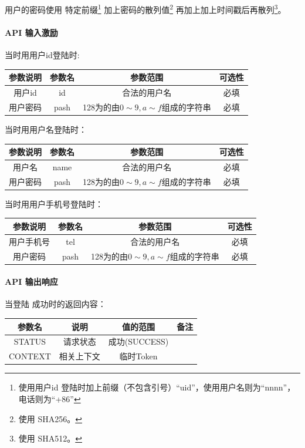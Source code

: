 \documentclass[UTF8]{article}
\def\apiexc{\paragraph{\colorbox[rgb]{1,0.85,0.45}{API 输入激励}}} %
\def\apiresp{\paragraph{\colorbox[rgb]{0.9,0.9,1}{API 输出响应}}} %
\def\成功{\colorbox[rgb]{0.4,1,0.5}{成功}}
\def\成功V{成功(SUCCESS)}
\begin{document}
    用户的密码使用 特定前缀\footnote{使用用户id 登陆时加上前缀（不包含引号）“uid”，使用用户名则为“nnnn”，电话则为“+86”}
    加上密码的散列值\footnote{使用 SHA256。}
    再加上加上时间戳后再散列\footnote{使用 SHA512。}。
    \apiexc
    当时用用户id登陆时:\\
    \begin{tabular}{|c|c|c|c|}
        \hline \rule[-2ex]{0pt}{5.5ex} 参数说明 & 参数名 & 参数范围 & 可选性 \\
        \hline \rule[-2ex]{0pt}{5.5ex} 用户id & id & 合法的用户名 & 必填 \\
        \hline \rule[-2ex]{0pt}{5.5ex} 用户密码 & pash & 128为的由$0\sim9,a\sim f$组成的字符串 & 必填 \\
        \hline 
    \end{tabular} 
    \par 当时用用户名登陆时：\\
    \begin{tabular}{|c|c|c|c|}
        \hline \rule[-2ex]{0pt}{5.5ex} 参数说明 & 参数名 & 参数范围 & 可选性 \\
        \hline \rule[-2ex]{0pt}{5.5ex} 用户名 & name & 合法的用户名 & 必填 \\
        \hline \rule[-2ex]{0pt}{5.5ex} 用户密码 & pash & 128为的由$0\sim9,a\sim f$组成的字符串 & 必填 \\
        \hline 
    \end{tabular} 
    \par 当时用用户手机号登陆时：\\
    \begin{tabular}{|c|c|c|c|}
        \hline \rule[-2ex]{0pt}{5.5ex} 参数说明 & 参数名 & 参数范围 & 可选性 \\
        \hline \rule[-2ex]{0pt}{5.5ex} 用户手机号 & tel & 合法的用户名 & 必填 \\
        \hline \rule[-2ex]{0pt}{5.5ex} 用户密码 & pash & 128为的由$0\sim9,a\sim f$组成的字符串 & 必填 \\
        \hline 
    \end{tabular} 
    \apiresp
    当登陆 \成功 时的返回内容：\\
    \begin{tabular}{|c|c|c|c|}
        \hline \rule[-2ex]{0pt}{5.5ex} 参数名 & 说明 & 值的范围 & 备注 \\
        \hline \rule[-2ex]{0pt}{5.5ex} STATUS & 请求状态 & \成功V &  \\ 
        \hline \rule[-2ex]{0pt}{5.5ex} CONTEXT & 相关上下文 & 临时Token &  \\
        \hline 
    \end{tabular} 
\end{document}
